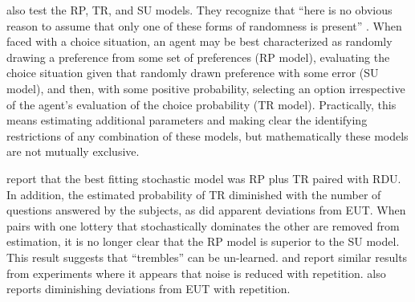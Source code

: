 \documentclass[../main.tex]{subfiles}
\begin{document}
\addtocounter{footnote}{-1}

\textcite{Loomes2002} also test the RP, TR, and SU models.
They recognize that \enquote{here is no obvious reason to assume that only one of these forms of randomness is present} \parencite*[106]{Loomes2002}.{\footnotemark}
When faced with a choice situation, an agent may be best characterized as randomly drawing a preference from some set of preferences (RP model), evaluating the choice situation given that randomly drawn preference with some error (SU model), and then, with some positive probability, selecting an option irrespective of the agent's evaluation of the choice probability (TR model).
Practically, this means estimating additional parameters and making clear the identifying restrictions of any combination of these models, but mathematically these models are not mutually exclusive.{\footnotemark}

\addtocounter{footnote}{-2}

\textcite{Loomes2002} report that the best fitting stochastic model was RP plus TR paired with RDU.
In addition, the estimated probability of TR diminished with the number of questions answered by the subjects, as did apparent deviations from EUT.
When pairs with one lottery that stochastically dominates the other are removed from estimation, it is no longer clear that the RP model is superior to the SU model.
This result suggests that \enquote{trembles} can be un-learned.
\textcite{Hey2001} and \textcite{Moffatt2002} report similar results from experiments where it appears that noise is reduced with repetition.
\textcite{Hey2001} also reports diminishing deviations from EUT with repetition.
\end{document}

